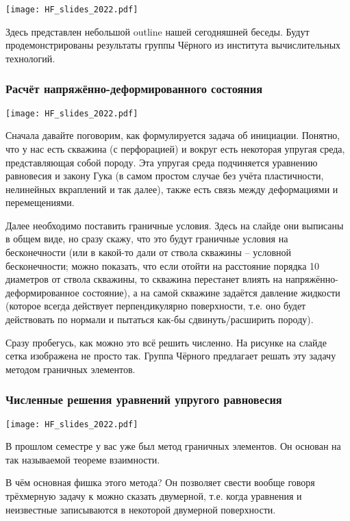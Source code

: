 \documentclass[main.tex]{subfiles}
\begin{document}
\texttt{[image: HF\_slides\_2022.pdf]}

Здесь представлен небольшой outline нашей сегодняшней беседы.
Будут продемонстрированы результаты группы Чёрного из института вычислительных технологий.

\subsubsection{Расчёт напряжённо-деформированного состояния}

\texttt{[image: HF\_slides\_2022.pdf]}

Сначала давайте поговорим, как формулируется задача об инициации.
Понятно, что у нас есть скважина (с перфорацией) и вокруг есть некоторая упругая среда, представляющая собой породу.
Эта упругая среда подчиняется уравнению равновесия и закону Гука (в самом простом случае без учёта пластичности, нелинейных вкраплений и так далее), также есть связь между деформациями и перемещениями.

Далее необходимо поставить граничные условия.
Здесь на слайде они выписаны в общем виде, но сразу скажу, что это будут граничные условия на бесконечности (или в какой-то дали от ствола скважины -- условной бесконечности; можно показать, что если отойти на расстояние порядка 10 диаметров от ствола скважины, то скважина перестанет влиять на напряжённо-деформированное состояние), а на самой скважине задаётся давление жидкости (которое всегда действует перпендикулярно поверхности, т.е. оно будет действовать по нормали и пытаться как-бы сдвинуть/расширить породу).

Сразу пробегусь, как можно это всё решить численно.
На рисунке на слайде сетка изображена не просто так.
Группа Чёрного предлагает решать эту задачу методом граничных элементов.

\subsubsection{Численные решения уравнений упругого равновесия}

\texttt{[image: HF\_slides\_2022.pdf]}

В прошлом семестре у вас уже был метод граничных элементов.
Он основан на так называемой теореме взаимности.

В чём основная фишка этого метода?
Он позволяет свести вообще говоря трёхмерную задачу к можно сказать двумерной, т.е. когда уравнения и неизвестные записываются в некоторой двумерной поверхности.
\end{document}
